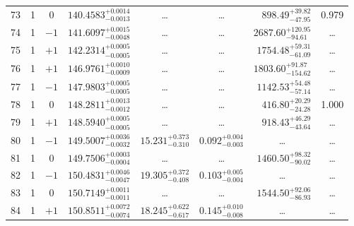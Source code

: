 \begin{table*}[!]
\begin{tabular}{llcrrlrc}
73 & 1 & 0 & $    140.4583_{-      0.0013}^{+      0.0014}$ & \multicolumn{1}{c}{\dots} & \multicolumn{1}{c}{\dots} & $      898.49_{-       47.95}^{+       39.82}$ & 0.979\\[1pt]
74 & 1 & $-1$ & $    141.6097_{-      0.0048}^{+      0.0015}$ & \multicolumn{1}{c}{\dots} & \multicolumn{1}{c}{\dots} & $     2687.60_{-       94.61}^{+      120.95}$ & \dots \\[1pt]
75 & 1 & $+1$ & $    142.2314_{-      0.0005}^{+      0.0005}$ & \multicolumn{1}{c}{\dots} & \multicolumn{1}{c}{\dots} & $     1754.48_{-       61.09}^{+       59.31}$ & \dots \\[1pt]

76 & 1 & $+1$ & $    146.9761_{-      0.0009}^{+      0.0010}$ & \multicolumn{1}{c}{\dots} & \multicolumn{1}{c}{\dots} & $     1803.60_{-      154.62}^{+       91.87}$ & \dots\\[1pt]
77 & 1 & $-1$ & $    147.9803_{-      0.0005}^{+      0.0005}$ & \multicolumn{1}{c}{\dots} & \multicolumn{1}{c}{\dots} & $     1142.53_{-       57.14}^{+       54.48}$ & \dots\\[1pt]
78 & 1 & 0 & $    148.2811_{-      0.0012}^{+      0.0013}$ & \multicolumn{1}{c}{\dots} & \multicolumn{1}{c}{\dots} & $      416.80_{-       24.28}^{+       20.29}$ & 1.000\\[1pt]
79 & 1 & $+1$ & $    148.5940_{-      0.0005}^{+      0.0005}$ & \multicolumn{1}{c}{\dots} & \multicolumn{1}{c}{\dots} & $      918.43_{-       43.64}^{+       46.29}$ & \dots\\[1pt]
80 & 1 & $-1$ & $    149.5007_{-      0.0032}^{+      0.0036}$ & $      15.231_{-       0.310}^{+       0.373}$ & $       0.092_{-       0.003}^{+       0.004}$ & \multicolumn{1}{c}{\dots} & \dots\\[1pt]
81 & 1 & 0 & $    149.7506_{-      0.0004}^{+      0.0003}$ & \multicolumn{1}{c}{\dots} & \multicolumn{1}{c}{\dots} & $     1460.50_{-       90.02}^{+       98.32}$ & \dots\\[1pt]
82 & 1 & $-1$ & $    150.4831_{-      0.0047}^{+      0.0046}$ & $      19.305_{-       0.408}^{+       0.372}$ & $       0.103_{-       0.004}^{+       0.005}$ & \multicolumn{1}{c}{\dots} & \dots\\[1pt]
83 & 1 & 0 & $    150.7149_{-      0.0011}^{+      0.0011}$ & \multicolumn{1}{c}{\dots} & \multicolumn{1}{c}{\dots} & $     1544.50_{-       86.93}^{+       92.06}$ & \dots\\[1pt]
84 & 1 & $+1$ & $    150.8511_{-      0.0074}^{+      0.0072}$ & $      18.245_{-       0.617}^{+       0.622}$ & $       0.145_{-       0.008}^{+       0.010}$ & \multicolumn{1}{c}{\dots} & \dots\\[1pt]

\end{tabular}
\end{table*}
